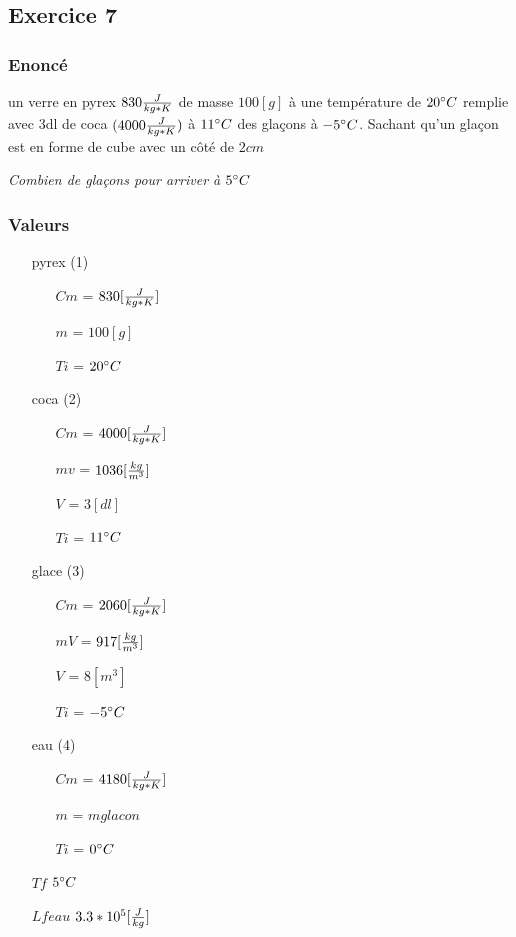 
\subsection{Exercice 7}
\subsubsection{Enoncé}
un verre en pyrex $830\cm$ de masse $100[g]$ à une température de $20\celsius$ remplie avec 3dl de coca $(4000\cm)$ à $11\celsius$ des glaçons à $-5\celsius$.
Sachant qu'un glaçon est en forme de cube avec un côté de $2cm$ 

\textit{Combien de glaçons pour arriver à $5\celsius$}
\subsubsection{Valeurs}
\begin{itemize}
    \item[pyrex] (1)
    \item[] 
    \begin{itemize}
        \item[$Cm$] = $830[\cm]$
        \item[$m$] =  $100[g]$
        \item[$Ti$] = $20\celsius$ 
    \end{itemize}
    \item[coca] (2)
    \item[] 
    \begin{itemize}
        \item[$Cm$] = $4000[\cm]$
        \item[$mv$] = $1036[\mv]$ 
        \item[$V$] = $3[dl]$
        \item[$Ti$] = $11\celsius$
    \end{itemize}
    \item[glace] (3)
    \item[] 
    \begin{itemize}
        \item[$Cm$] = $2060[\cm]$
        \item[$mV$] = $917[\mv]$
        \item[$V$] = $8[m^3]$
        \item[$Ti$] = $-5\celsius$
    \end{itemize}
    \item[eau] (4)
    \item[] 
    \begin{itemize}
        \item[$Cm$] = $4180[\cm]$
        \item[$m$] = $mglacon$
        \item[$Ti$] = $0\celsius$
    \end{itemize}
    \item[$Tf$] $5\celsius$
    \item[$Lfeau$] $3.3*10^5[\lf]$ 
\end{itemize}
